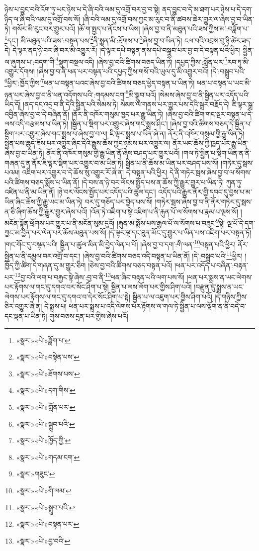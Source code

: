 ཉེས་པ་བྱུང་བའི་འོག་ཏུ་ཡང་ཉེས་པ་དེ་ཞི་བའི་ལམ་དུ་འགྲོ་བར་བྱ་བ་སྟེ། ནད་བྱུང་བ་དེ་མ་ཐག་པར་ཉེས་པ་དེ་དག་ཉིད་ལ་ཞི་བའི་ལམ་དུ་འགྲོ་བས་སོ། །ཞི་བའི་ལམ་དུ་འགྲོ་བས་ཀྱང་མ་རུང་བ་ནི་ཚབས་ཆེར་གྱུར་ལ་ཞེས་བྱ་བ་ཡིན་ཏེ། གསོར་མི་རུང་བར་གྱུར་པའོ། །ཆོ་ག་སྤྱད་པ་ནོངས་པ་ཡིས། །ཞེས་བྱ་བ་ནི་མཐུན་པའི་ཟས་ཀྱིས་མ་:བཟློག་པ་\footnote{«སྣར་»«པེ་»ཟློག་པ་}དང་། མི་མཐུན་པའི་ཟས་:བསྟན་པས་\footnote{«སྣར་»«པེ་»བསྟེན་པས་}ནི་སྨན་མི་:ཐོགས་པ་\footnote{«སྣར་»«པེ་»ཐོགས་པས་}ཞེས་བྱ་བ་ཡིན་ཏེ། ངལ་བའི་འབྲས་བུ་ཉི་ཚེར་ཟད་དེ། དེ་ལྟར་ནད་ཉེ་བར་ཞི་བར་མི་འགྱུར་རོ། །དེ་ལྟར་དཔེ་བསྟན་ནས་དཔེ་བསྒྲུབ་པར་བྱ་བ་དེ་བསྟན་པའི་ཕྱིར། སྦྱིན་ལ་ཞུགས་པ་:བདག་གི་\footnote{«སྣར་»«པེ་»དག་གིས་}སྡུག་བསྔལ་འདི། །ཞེས་བྱ་བའི་ཚིགས་བཅད་ཡིན་ཏེ། །དཔྱད་ཀྱིས་:སློན་པར་\footnote{«སྣར་»«པེ་»གློན་པར་}རབ་ཏུ་མི་འགྱུར་དོགས། །ཞེས་བྱ་བ་ནི་ཕན་པར་བསྟན་པའི་དཔྱད་ཀྱིས་གསོ་བའི་ཡུལ་དུ་མི་འགྱུར་བའོ། །དེ་:བསྒྲུབ་པའི་\footnote{«སྣར་»«པེ་»སྒྲུབ་པའི་}ཕྱིར་:ཁྱོད་ཀྱིས་\footnote{«སྣར་»«པེ་»ཁྱོད་ཀྱི་}ཕན་པ་བསྟན་པའང་ཞེས་བྱ་བའི་ཚིགས་བཅད་ཕྱེད་བསྟན་པ་ཡིན་ཏེ། ཕན་པ་བསྟན་པ་ཡང་མི་ཉན་པར་ཞེས་བྱ་བ་ནི་ཕན་འདོགས་པའི་:གདམས་ངག་\footnote{«སྣར་»«པེ་»གདམ་ངག་}མི་སྒྲུབ་པའོ། །སེམས་ཞེས་བྱ་བ་ནི་སྦྱིན་པར་འདོད་པའི་ཡིད་དོ། །ནད་དང་འདྲ་བ་ནི་དེའི་སྦྱིན་པའི་སེམས་ཏེ། སེམས་ལ་གནས་པར་གྱུར་པས་དེའི་སྒྲར་བརྗོད་དེ། ཇི་ལྟར་སྒྲ་འབྱིན་ཞེས་བྱ་བ་དེ་བཞིན་ནོ། །ནོར་ནི་འཁོར་གསུམ་ཁྱད་པར་རྒྱུ་ཡིན་ཏེ། །ཞེས་བྱ་བའི་ཚིག་གང་སྔར་བསྟན་པ་དེ་ལས་འདི་བརྩམས་པ་ཡིན་ཏེ། །སྦྱིན་པ་སྡིག་པར་འགྱུར་ཞེས་གང་སྨྲས་ཤིང་། །ཞེས་བྱ་བའི་ཚིགས་བཅད་དེ་སྦྱིན་པ་སྡིག་པར་འགྱུར་ཞེས་གང་སྨྲས་པ་ཞེས་བྱ་བ་ལ། ཇི་ལྟར་སྨྲས་པ་ཡིན་ཞེ་ན། ནོར་ནི་འཁོར་གསུམ་གྱི་རྒྱུ་ཡིན་ཏེ། སྦྱིན་པས་ཆུད་ཟོས་པར་འགྱུར་ཞིང་དེའི་རྒྱུས་ཆོས་ཀྱང་ཉམས་པར་འགྱུར་ལ། ནོར་ཡང་ཆོས་ཀྱི་ཁྱད་པར་རྒྱུ་ཡིན་ཞེས་བྱ་བ་ཡིན་ཏེ། ནོར་ནི་འཁོར་གསུམ་གྱི་རྒྱུ་ཡིན་ནོ་ཞེས་བཤད་པར་གྱུར་པའོ། །གལ་ཏེ་སྦྱིན་པ་སྡིག་ཡིན་ན་ནི་གཞན་དུ་ན་ནོར་ཇི་ལྟར་སྡིག་པར་འགྱུར་བ་མ་ཡིན་ཏེ། སྦྱིན་པ་ནི་ཆོས་མ་ཡིན་པར་བཤད་པས་སོ། །གཏེར་དུ་སྦས་པའམ། འཇིག་པར་འགྱུར་བ་དེ་ཆོས་སུ་འགྱུར་རོ་ཞེ་ན། དེ་བསྟན་པའི་ཕྱིར། དེ་ནི་གཏེར་སྦས་ཞེས་བྱ་བ་ལ་སོགས་པའི་ཚིགས་བཅད་སྨོས་པ་ཡིན་ནོ། །དེ་བས་ན་ཉེ་བར་ལོངས་སྤྱོད་པས་ན་ཆོས་ཀྱི་རྒྱུར་གྱུར་པ་ཡིན་ཏེ། ཀུན་ཏུ་འཛིན་པ་ནི་མ་ཡིན་ནོ། །ཉེ་བར་ལོངས་སྤྱོད་པར་འདོད་པའི་ཚུལ་དང་། འདོད་པའི་རྒྱུར་ནོར་གྱི་དབང་དུ་བྱས་པ་མ་ཡིན་ཞིང་ཆོས་ཀྱི་རྒྱུ་ཡང་མ་ཡིན་ཏེ། བར་དུ་གཅོད་པར་བྱེད་པས་སོ། །གཏེར་སྦས་ཞེས་བྱ་བ་ནི་ནོར་གཏེར་དུ་སྦས་ན་ཅི་ཞིག་ཆོས་ཀྱི་རྒྱུར་གྱུར་ཞེས་པའོ། །འོན་ཏེ་འཇིག་པ་སྟེ་འཇིག་པ་ནི་རྐུན་པོ་ལ་སོགས་པ་རྣམ་པ་ལྔས་སོ། །མངོན་སྟོན་ཕྲོགས་པར་གྱུར་པ་ནི་མངོན་སུམ་དུའོ། །རྐུན་མ་སྨོས་པས་རྒྱལ་པོ་ལ་སོགས་པ་བཟུང་\footnote{«སྣར་»གཟུང་}སྟེ། ལྔ་པོ་དེ་དག་ཀྱང་མ་བྱིན་པར་ལེན་པར་ཆོས་མཐུན་པས་སོ། །དེ་ལྟར་ལྔ་དང་ཐུན་མོང་དུ་གྱུར་པ་ཡིན་པས་འཇིག་པར་བསྟན་ཏོ། །གང་གོང་དུ་བསྟན་པའི། སྦྱིན་པ་ཚུལ་མིན་མི་བྱེད་ལེན་པ་པོ། །ཞེས་བྱ་བ་དག་:གི་ལན་\footnote{«སྣར་»«པེ་»གི་ལམ་}བསྟན་པའི་ཕྱིར། ནོར་སྦྱིན་པ་ནི་དམྱལ་བར་འགྲོ་བ་དང་། །ཞེས་བྱ་བའི་ཚིགས་བཅད་འདི་བསྟན་པ་ཡིན་ནོ། །དེ་:བསྒྲུབ་པའི་\footnote{«སྣར་»«པེ་»སྒྲུབ་པའི་}ཕྱིར། །ཁྱོད་ཀྱི་ཚིག་དེ་གཞན་དུ་མ་གྱུར་ཅིག །ཅེས་བྱ་བའི་ཚིགས་བཅད་བསྟན་པའོ། །ཕན་པར་འདོད་པ་བཞིན་:བརྟན་པར་\footnote{«སྣར་»«པེ་»བསྟན་པར་}བྱ་བའི་ལག་པ་བརྐྱང་སྟེ་ཞེས་:བྱ་བ་ནི་\footnote{«སྣར་»«པེ་»བྱ་བའི་}ཕན་ཞིང་བརྟན་པའི་ལག་པས་སོ། །ཕན་པར་སྨྲས་ན་ཡང་ལེགས་པར་རྟོགས་ལ་གང་དུ་དགའ་བར་སོང་ཤིག་པ་སྟེ། སྦྱིན་པ་ལས་ལོག་པར་གྱིས་ཤིག་པའོ། །བརྫུན་དུ་སྨྲས་ན་ཡང་ལེགས་པར་རྟོགས་ལ་གང་དུ་དགའ་བ་དེར་སོང་ཤིག་པ་སྟེ། སྦྱིན་པ་ལ་འཇུག་པར་གྱིས་ཤིག་པའོ། །དེ་གཉིས་ཀྱིས་ཅིར་འགྱུར་ཞེ་ན། དེ་སྨྲས་པ། ཕན་པར་སྨྲས་པ་འདི་ལེགས་པར་རྟོགས་ལ་གལ་ཏེ་སྦྱིན་པ་ལས་ལྡོག་ན་ནི་བདེ་བ་དང་ལྡན་པ་ཡིན་ཏེ། གུས་བཅས་དྲན་པར་གྱིས་ཞེས་པའོ། 